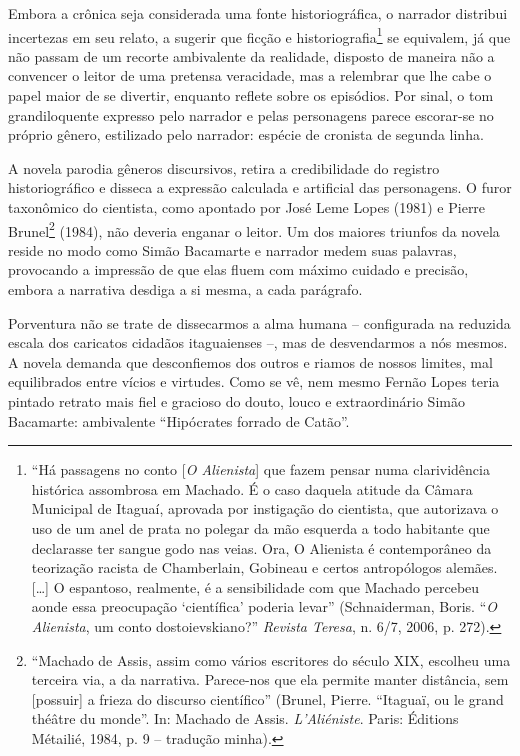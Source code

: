 Embora a crônica seja considerada uma fonte historiográfica, o narrador
distribui incertezas em seu relato, a sugerir que ficção e
historiografia\footnote{``Há passagens no conto {[}\emph{O Alienista}{]}
  que fazem pensar numa clarividência histórica assombrosa em Machado. É
  o caso daquela atitude da Câmara Municipal de Itaguaí, aprovada por
  instigação do cientista, que autorizava o uso de um anel de prata no
  polegar da mão esquerda a todo habitante que declarasse ter sangue
  godo nas veias. Ora, O Alienista é contemporâneo da teorização racista
  de Chamberlain, Gobineau e certos antropólogos alemães. {[}\ldots{}{]}
  O espantoso, realmente, é a sensibilidade com que Machado percebeu
  aonde essa preocupação `científica' poderia levar'' (Schnaiderman,
  Boris. ``\emph{O Alienista}, um conto dostoievskiano?'' \emph{Revista
  Teresa}, n. 6/7, 2006, p. 272).} se equivalem, já que não passam de um
recorte ambivalente da realidade, disposto de maneira não a convencer o
leitor de uma pretensa veracidade, mas a relembrar que lhe cabe o papel
maior de se divertir, enquanto reflete sobre os episódios. Por sinal, o
tom grandiloquente expresso pelo narrador e pelas personagens parece
escorar-se no próprio gênero, estilizado pelo narrador: espécie de
cronista de segunda linha.

A novela parodia gêneros discursivos, retira a credibilidade do registro
historiográfico e disseca a expressão calculada e artificial das
personagens. O furor taxonômico do cientista, como apontado por José
Leme Lopes (1981) e Pierre Brunel\footnote{``Machado de Assis, assim
  como vários escritores do século XIX, escolheu uma terceira via, a da
  narrativa. Parece-nos que ela permite manter distância, sem
  {[}possuir{]} a frieza do discurso científico'' (Brunel, Pierre.
  ``Itaguaï, ou le grand théâtre du monde''. In: Machado de Assis.
  \emph{L'Aliéniste}. Paris: Éditions Métailié, 1984, p. 9 -- tradução
  minha).} (1984), não deveria enganar o leitor. Um dos maiores triunfos
da novela reside no modo como Simão Bacamarte e narrador medem suas
palavras, provocando a impressão de que elas fluem com máximo cuidado e
precisão, embora a narrativa desdiga a si mesma, a cada parágrafo.

Porventura não se trate de dissecarmos a alma humana -- configurada na
reduzida escala dos caricatos cidadãos itaguaienses --, mas de
desvendarmos a nós mesmos. A novela demanda que desconfiemos dos outros
e riamos de nossos limites, mal equilibrados entre vícios e virtudes.
Como se vê, nem mesmo Fernão Lopes teria pintado retrato mais fiel e
gracioso do douto, louco e extraordinário Simão Bacamarte: ambivalente
``Hipócrates forrado de Catão''.


